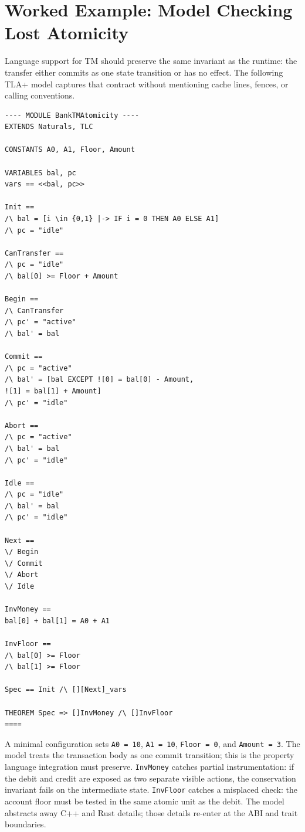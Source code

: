 \section{Worked Example: Model Checking Lost Atomicity}
\label{sec:tla-bank-language-contract}

Language support for TM should preserve the same invariant as the runtime: the
transfer either commits as one state transition or has no effect. The
following TLA+ model captures that contract without mentioning cache lines,
fences, or calling conventions.

\begin{lstlisting}[language={}, caption={A TLC-checkable TLA+ model of an
atomic bank transfer with money-conservation and floor invariants.},
label={lst:bank-tm-atomicity}]
---- MODULE BankTMAtomicity ----
EXTENDS Naturals, TLC

CONSTANTS A0, A1, Floor, Amount

VARIABLES bal, pc
vars == <<bal, pc>>

Init ==
/\ bal = [i \in {0,1} |-> IF i = 0 THEN A0 ELSE A1]
/\ pc = "idle"

CanTransfer ==
/\ pc = "idle"
/\ bal[0] >= Floor + Amount

Begin ==
/\ CanTransfer
/\ pc' = "active"
/\ bal' = bal

Commit ==
/\ pc = "active"
/\ bal' = [bal EXCEPT ![0] = bal[0] - Amount,
![1] = bal[1] + Amount]
/\ pc' = "idle"

Abort ==
/\ pc = "active"
/\ bal' = bal
/\ pc' = "idle"

Idle ==
/\ pc = "idle"
/\ bal' = bal
/\ pc' = "idle"

Next ==
\/ Begin
\/ Commit
\/ Abort
\/ Idle

InvMoney ==
bal[0] + bal[1] = A0 + A1

InvFloor ==
/\ bal[0] >= Floor
/\ bal[1] >= Floor

Spec == Init /\ [][Next]_vars

THEOREM Spec => []InvMoney /\ []InvFloor
====
\end{lstlisting}

A minimal configuration sets \texttt{A0 = 10}, \texttt{A1 = 10},
\texttt{Floor = 0}, and \texttt{Amount = 3}. The model treats the transaction
body as one commit transition; this is the property language integration must
preserve. \texttt{InvMoney} catches partial instrumentation: if the debit and
credit are exposed as two separate visible actions, the conservation invariant
fails on the intermediate state. \texttt{InvFloor} catches a misplaced check:
the account floor must be tested in the same atomic unit as the debit. The
model abstracts away C++ and Rust details; those details re-enter at the ABI
and trait boundaries.

